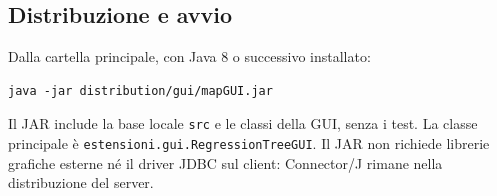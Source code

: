 \subsection*{Distribuzione e avvio}

Dalla cartella principale, con Java 8 o successivo installato:

\begin{lstlisting}
java -jar distribution/gui/mapGUI.jar
\end{lstlisting}

Il JAR include la base locale \texttt{src} e le classi della GUI, senza i test.
La classe principale è \texttt{estensioni.gui.RegressionTreeGUI}.
Il JAR non richiede librerie grafiche esterne né il driver
JDBC sul client: Connector/J rimane nella distribuzione del server.
